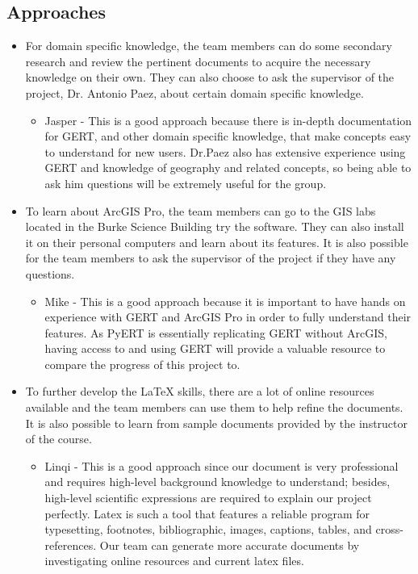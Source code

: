 \documentclass[12pt, titlepage]{article}
\begin{document}
\subsection*{Approaches}
\begin{itemize}
    \item For domain specific knowledge, the team members can do some secondary research and review the pertinent documents to acquire the necessary knowledge on their own. They can also choose to ask the supervisor of the project, Dr. Antonio Paez, about certain domain specific knowledge.
    \begin{itemize}
        \item Jasper - This is a good approach because there is in-depth documentation for GERT, and other domain specific knowledge, that make concepts easy to understand for new users. Dr.Paez also has extensive experience using GERT and knowledge of geography and related concepts, so being able to ask him questions will be extremely useful for the group.
    \end{itemize}
    \item To learn about ArcGIS Pro, the team members can go to the GIS labs located in the Burke Science Building try the software. They can also install it on their personal computers and learn about its features. It is also possible for the team members to ask the supervisor of the project if they have any questions.
    \begin{itemize}
        \item Mike - This is a good approach because it is important to have hands on experience with GERT and ArcGIS Pro in order to fully understand their features. As PyERT is essentially replicating GERT without ArcGIS, having access to and using GERT will provide a valuable resource to compare the progress of this project to.
    \end{itemize}
    \item To further develop the LaTeX skills, there are a lot of online resources available and the team members can use them to help refine the documents. It is also possible to learn from sample documents provided by the instructor of the course.
    \begin{itemize}
        \item Linqi - This is a good approach since our document is very professional and requires high-level background knowledge to understand; besides, high-level scientific expressions are required to explain our project perfectly. Latex is such a tool that features a reliable program for typesetting, footnotes, bibliographic, images, captions, tables, and cross-references. Our team can generate more accurate documents by investigating online resources and current latex files.

\end{itemize}
\end{itemize}
\end{document}
